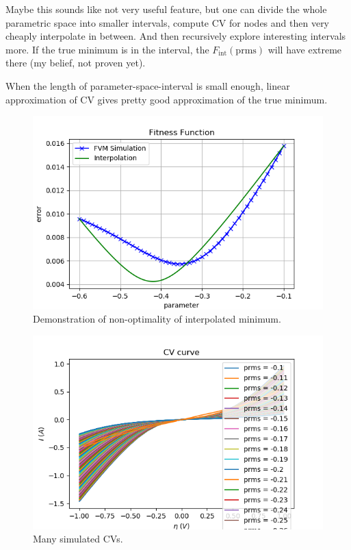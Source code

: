 \documentclass{article}
\numberwithin{equation}{section}
\def\prms{\text{prms}}
\def\fint{F_\text{int}}
\begin{document}
Maybe this sounds like not very useful feature, but one can divide the whole parametric space into smaller intervals, compute CV for nodes and then very cheaply interpolate in between. And then recursively explore interesting intervals more. If the true minimum is in the interval, the $\fint(\prms)$ will have extreme there (my belief, not proven yet).

When the length of parameter-space-interval is small enough, linear approximation of CV gives pretty good approximation of the true minimum.

\begin{figure}
	\centering
  	\includegraphics[scale=0.5]{./Images/FF_more.png}
	\caption{Demonstration of non-optimality of interpolated minimum.}
	\label{fig:FF_more}
\end{figure}
\begin{figure}
	\centering
  	\includegraphics[scale=0.5]{./Images/CV_more.png}
	\caption{Many simulated CVs.}
	\label{fig:CV_more}
\end{figure}
\end{document}
